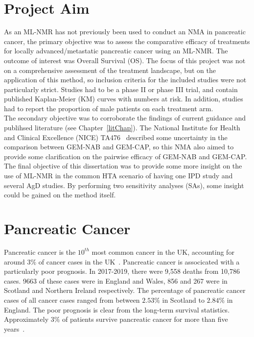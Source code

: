 \section{Project Aim}\label{sec:aims}
As an ML-NMR has not previously been used to conduct an NMA in pancreatic cancer, the primary objective was to assess the comparative efficacy of treatments for locally advanced/metastatic pancreatic cancer using an ML-NMR. The outcome of interest was Overall Survival (OS). The focus of this project was not on a comprehensive assessment of the treatment landscape, but on the application of this method, so inclusion criteria for the included studies were not particularly strict. Studies had to be a phase II or phase III trial, and contain published Kaplan-Meier (KM) curves with numbers at risk. In addition, studies had to report the proportion of male patients on each treatment arm. \\

The secondary objective was to corroborate the findings of current guidance and publihsed literature (see Chapter~\ref{litChap}). The National Institute for Health and Clinical Excellence (NICE) TA476~\cite{TA476} described some uncertainty in the comparison between GEM-NAB and GEM-CAP, so this NMA also aimed to provide some clarification on the pairwise efficacy of GEM-NAB and GEM-CAP. \\

The final objective of this dissertation was to provide some more insight on the use of ML-NMR in the common HTA scenario of having one IPD study and several AgD studies. By performing two sensitivity analyses (SAs), some insight could be gained on the method itself. 

\section{Pancreatic Cancer}
Pancreatic cancer is the $10^{th}$ most common cancer in the UK, accounting for around $3\%$ of cancer cases in the UK~\cite{pancStat}. Pancreatic cancer is associcated with a particularly poor prognosis. In 2017-2019, there were 9,558 deaths from 10,786 cases. 9663 of these cases were in England and Wales, 856 and 267 were in Scotland and Northern Ireland respectively. The percentage of pancreatic cancer cases of all cancer cases ranged from between $2.53\%$ in Scotland to $2.84\%$ in England. The poor prognosis is clear from the long-term survival statistics. Approximately $3\%$ of patients survive pancreatic cancer for more than five years~\cite{NG85}.\\

